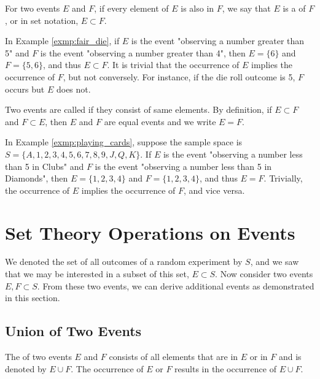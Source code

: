 For two events \( E \) and \( F \), if every element of \( E \) is also in \( F \), we say that
\( E \) is a  of \( F \), or in set notation, \( E \subset F \).
\begin{exmp}
	In Example \autoref{exmp:fair_die}, if \( E \) is the event "observing a number greater than 5"
	and \( F \) is the event "observing a number greater than 4",
	then \( E = \{ 6 \} \) and \( F = \{ 5, 6 \} \), and thus \( E \subset F \).
	It is trivial that the occurrence of \( E \) implies the occurrence of \( F \), but not conversely.
	For instance, if the die roll outcome is 5, \( F \) occurs but \( E \) does not.
\end{exmp}
Two events are called  if they consist of same elements.
By definition, if \( E \subset F \) and \( F \subset E \), then \( E \) and \( F \) are equal events
and we write \( E = F \).
\begin{exmp}
	In Example \autoref{exmp:playing_cards}, suppose the sample space is \( S = \{ A, 1, 2, 3, 4, 5, 6, 7, 8, 9, J, Q, K \} \).
	If \( E \) is the event "observing a number less than 5 in Clubs"
	and \( F \) is the event "observing a number less than 5 in Diamonds",
	then \( E = \{ 1, 2, 3, 4 \} \) and \( F = \{ 1, 2, 3, 4 \} \), and thus \( E = F \).
	Trivially, the occurrence of \( E \) implies the occurrence of \( F \), and vice versa.
\end{exmp}

\section{Set Theory Operations on Events}

We denoted the set of all outcomes of a random experiment by \( S \),
and we saw that we may be interested in a subset of this set, \( E \subset S \).
Now consider two events \( E, F \subset S \).
From these two events, we can derive additional events as demonstrated in this section.

\subsection{Union of Two Events}

The  of two events \( E \) and \( F \) consists of all elements that are in \( E \) or in \( F \) and is denoted by \( E \cup F \).
The occurrence of \( E \) or \( F \) results in the occurrence of \( E \cup F \).

